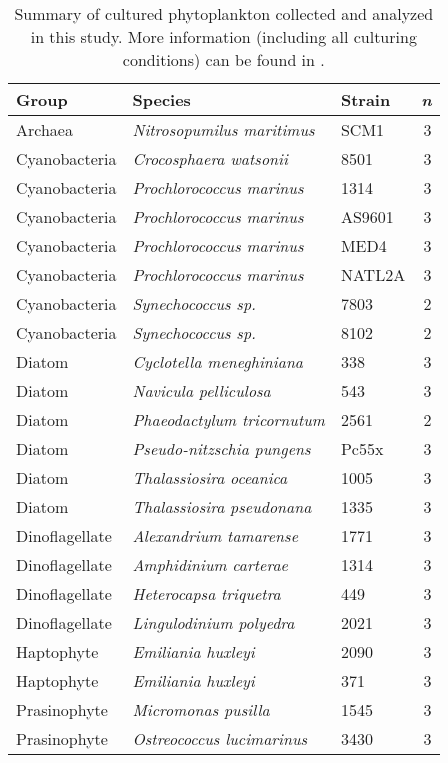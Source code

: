\begin{table}[ht]
\centering
\begin{tabular}{lllr}
  \hline
Group & Species & Strain & \textit{n} \\ 
  \hline
Archaea & \textit{Nitrosopumilus maritimus} & SCM1 &   3 \\ 
  Cyanobacteria & \textit{Crocosphaera watsonii} & 8501 &   3 \\ 
  Cyanobacteria & \textit{Prochlorococcus marinus} & 1314 &   3 \\ 
  Cyanobacteria & \textit{Prochlorococcus marinus} & AS9601 &   3 \\ 
  Cyanobacteria & \textit{Prochlorococcus marinus} & MED4 &   3 \\ 
  Cyanobacteria & \textit{Prochlorococcus marinus} & NATL2A &   3 \\ 
  Cyanobacteria & \textit{Synechococcus sp.} & 7803 &   2 \\ 
  Cyanobacteria & \textit{Synechococcus sp.} & 8102 &   2 \\ 
  Diatom & \textit{Cyclotella meneghiniana} & 338 &   3 \\ 
  Diatom & \textit{Navicula pelliculosa} & 543 &   3 \\ 
  Diatom & \textit{Phaeodactylum tricornutum} & 2561 &   2 \\ 
  Diatom & \textit{Pseudo-nitzschia pungens} & Pc55x &   3 \\ 
  Diatom & \textit{Thalassiosira oceanica} & 1005 &   3 \\ 
  Diatom & \textit{Thalassiosira pseudonana} & 1335 &   3 \\ 
  Dinoflagellate & \textit{Alexandrium tamarense} & 1771 &   3 \\ 
  Dinoflagellate & \textit{Amphidinium carterae} & 1314 &   3 \\ 
  Dinoflagellate & \textit{Heterocapsa triquetra} & 449 &   3 \\ 
  Dinoflagellate & \textit{Lingulodinium polyedra} & 2021 &   3 \\ 
  Haptophyte & \textit{Emiliania huxleyi} & 2090 &   3 \\ 
  Haptophyte & \textit{Emiliania huxleyi} & 371 &   3 \\ 
  Prasinophyte & \textit{Micromonas pusilla} & 1545 &   3 \\ 
  Prasinophyte & \textit{Ostreococcus lucimarinus} & 3430 &   3 \\ 
   \hline
\end{tabular}
\caption{\label{CultureSampleDescriptions}Summary of cultured phytoplankton collected and analyzed in this study. More information (including all culturing conditions) can be found in \cite{Durham2019}.} 
\end{table}
